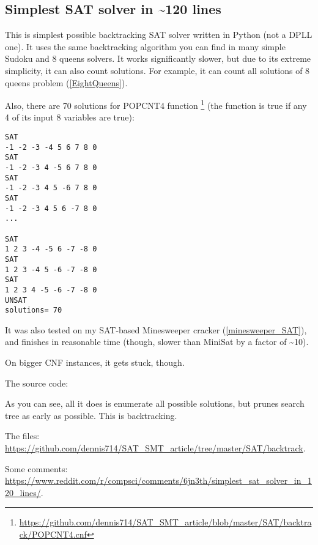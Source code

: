 \subsection{Simplest SAT solver in \textasciitilde{}120 lines}
\label{SAT_backtrack}

This is simplest possible backtracking SAT solver written in Python (not a \ac{DPLL} one).
It uses the same backtracking algorithm you can find in many simple Sudoku and 8 queens solvers.
It works significantly slower, but due to its extreme simplicity, it can also count solutions.
For example, it can count all solutions of 8 queens problem (\ref{EightQueens}).

Also, there are 70 solutions for POPCNT4 function
\footnote{\url{https://github.com/dennis714/SAT_SMT_article/blob/master/SAT/backtrack/POPCNT4.cnf}}
(the function is true if any 4 of its input 8 variables are true):

\begin{lstlisting}
SAT
-1 -2 -3 -4 5 6 7 8 0
SAT
-1 -2 -3 4 -5 6 7 8 0
SAT
-1 -2 -3 4 5 -6 7 8 0
SAT
-1 -2 -3 4 5 6 -7 8 0
...

SAT
1 2 3 -4 -5 6 -7 -8 0
SAT
1 2 3 -4 5 -6 -7 -8 0
SAT
1 2 3 4 -5 -6 -7 -8 0
UNSAT
solutions= 70
\end{lstlisting}

It was also tested on my SAT-based Minesweeper cracker (\ref{minesweeper_SAT}),
and finishes in reasonable time (though, slower than MiniSat by a factor of \textasciitilde{}10).

On bigger \ac{CNF} instances, it gets stuck, though.

The source code:



As you can see, all it does is enumerate all possible solutions, but prunes search tree as early as possible.
This is backtracking.

The files: \url{https://github.com/dennis714/SAT_SMT_article/tree/master/SAT/backtrack}.

Some comments: \url{https://www.reddit.com/r/compsci/comments/6jn3th/simplest_sat_solver_in_120_lines/}.

